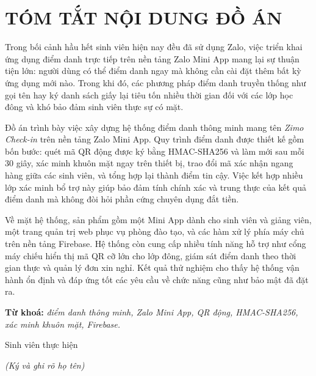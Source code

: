 \documentclass[../main.tex]{subfiles}
\begin{document}
\chapter*{TÓM TẮT NỘI DUNG ĐỒ ÁN}
\thispagestyle{plain}

Trong bối cảnh hầu hết sinh viên hiện nay đều đã sử dụng Zalo, việc triển khai ứng dụng điểm
danh trực tiếp trên nền tảng Zalo Mini App mang lại sự thuận tiện lớn: người dùng có thể điểm
danh ngay mà không cần cài đặt thêm bất kỳ ứng dụng mới nào. Trong khi đó, các phương pháp
điểm danh truyền thống như gọi tên hay ký danh sách giấy lại tiêu tốn nhiều thời gian đối với
các lớp học đông và khó bảo đảm sinh viên thực sự có mặt.

Đồ án trình bày việc xây dựng hệ thống điểm danh thông minh mang tên \textit{Zimo Check-in}
trên nền tảng Zalo Mini App. Quy trình điểm danh được thiết kế gồm bốn bước: quét mã QR động
được ký bằng HMAC-SHA256 và làm mới sau mỗi 30 giây, xác minh khuôn mặt ngay trên thiết bị,
trao đổi mã xác nhận ngang hàng giữa các sinh viên, và tổng hợp lại thành điểm tin cậy. Việc
kết hợp nhiều lớp xác minh bổ trợ này giúp bảo đảm tính chính xác và trung thực của kết quả
điểm danh mà không đòi hỏi phần cứng chuyên dụng đắt tiền.

Về mặt hệ thống, sản phẩm gồm một Mini App dành cho sinh viên và giảng viên, một trang quản
trị web phục vụ phòng đào tạo, và các hàm xử lý phía máy chủ trên nền tảng Firebase. Hệ thống
còn cung cấp nhiều tính năng hỗ trợ như cổng máy chiếu hiển thị mã QR cỡ lớn cho lớp đông,
giám sát điểm danh theo thời gian thực và quản lý đơn xin nghỉ. Kết quả thử nghiệm cho thấy hệ
thống vận hành ổn định và đáp ứng tốt các yêu cầu về chức năng cũng như bảo mật đã đặt ra.

\vspace{1em}
\noindent\textbf{Từ khoá:} \textit{điểm danh thông minh, Zalo Mini App, QR động, HMAC-SHA256, xác minh khuôn mặt, Firebase.}

\vspace{1em}
\begin{flushright}
Sinh viên thực hiện

\vspace{2em}
\textit{(Ký và ghi rõ họ tên)}
\end{flushright}
\end{document}
